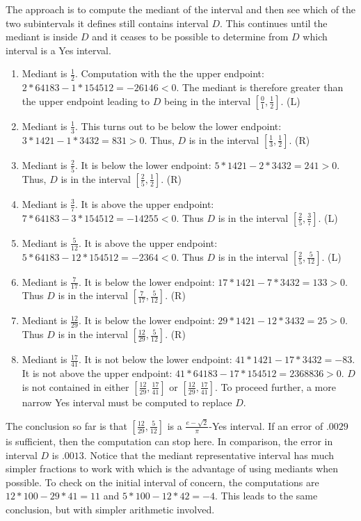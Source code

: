 \documentclass[12pt]{article}
\theoremstyle{remark}
\begin{document}
The approach is to compute the mediant of the interval and then see which of the two subintervals it defines still contains interval $D$. This continues until the mediant is inside $D$ and it ceases to be possible to determine from $D$ which interval is a Yes interval. 
\begin{enumerate}
\item Mediant is $\frac{1}{2}$. Computation with the the upper endpoint:  $2*64183 - 1*154512 = -26146 < 0$. The mediant is therefore greater than the upper endpoint leading to $D$ being in the interval $[\frac{0}{1}, \frac{1}{2}]$. (L)
\item Mediant is $\frac{1}{3}$. This turns out to be below the lower endpoint:  $3*1421 - 1*3432 = 831>0$. Thus, $D$ is in the interval $[\frac{1}{3}, \frac{1}{2}]$. (R)
\item Mediant is $\frac{2}{5}$. It is below the lower endpoint: $5*1421 - 2*3432 = 241 > 0$. Thus, $D$ is in the interval $[\frac{2}{5}, \frac{1}{2}]$. (R)
\item Mediant is $\frac{3}{7}$. It is above the upper endpoint: $7*64183- 3*154512 = -14255 < 0$. Thus $D$ is in the interval $[\frac{2}{5}, \frac{3}{7}]$. (L)
\item Mediant is $\frac{5}{12}$. It is above the upper endpoint: $5*64183 - 12*154512 = -2364 < 0$. Thus $D$ is in the interval $[\frac{2}{5}, \frac{5}{12}]$. (L)
\item Mediant is $\frac{7}{17}$. It is below the lower endpoint: $17*1421 - 7*3432 = 133 > 0$. Thus $D$ is in the interval $[\frac{7}{17}, \frac{5}{12}]$. (R)
\item Mediant is $\frac{12}{29}$. It is below the lower endpoint: $29*1421 - 12*3432 = 25 > 0$. Thus $D$ is in the interval $[\frac{12}{29}, \frac{5}{12}]$. (R)
\item Mediant is $\frac{17}{41}$. It is not below the lower endpoint: $41*1421-17*3432 = -83$. It is not above the upper endpoint: $41*64183-17*154512 = 2368836 >0$. $D$ is not contained in either $[\frac{12}{29}, \frac{17}{41}]$ or $[\frac{12}{29},\frac{17}{41}]$. To proceed further, a more narrow Yes interval must be computed to replace $D$. 
\end{enumerate}
The conclusion so far is that $[\frac{12}{29}, \frac{5}{12}]$ is a $\frac{e-\sqrt{2}}{\pi}$-Yes interval. If an error of $.0029$ is sufficient, then the computation can stop here. In comparison, the error in interval $D$ is $.0013$. Notice that the mediant representative interval has much simpler fractions to work with which is the advantage of using mediants when possible. To check on the initial interval of concern, the computations are $12*100 - 29*41 = 11$ and $5*100-12*42 = -4$. This leads to the same conclusion, but with simpler arithmetic involved. 
\end{document}
